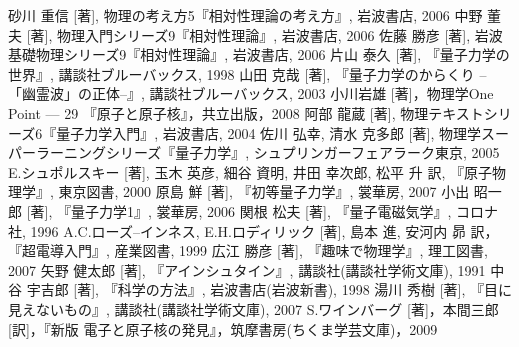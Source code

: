 \begin{thebibliography}{99}
     砂川 重信 [著], 物理の考え方5『相対性理論の考え方』, 岩波書店, 2006
     中野 董夫 [著], 物理入門シリーズ9『相対性理論』, 岩波書店, 2006
     佐藤 勝彦 [著], 岩波基礎物理シリーズ9『相対性理論』, 岩波書店, 2006
     片山 泰久 [著], 『量子力学の世界』, 講談社ブルーバックス, 1998
     山田 克哉 [著], 『量子力学のからくり --「幽霊波」の正体--』, 講談社ブルーバックス, 2003
     小川岩雄 [著]，物理学One Point --- 29 『原子と原子核』，共立出版，2008
      阿部 龍蔵 [著], 物理テキストシリーズ6『量子力学入門』, 岩波書店, 2004
      佐川 弘幸, 清水 克多郎 [著], 物理学スーパーラーニングシリーズ『量子力学』, シュプリンガーフェアラーク東京, 2005
      E.シュポルスキー [著], 玉木 英彦, 細谷 資明, 井田 幸次郎, 松平 升 訳, 『原子物理学\I』, 東京図書, 2000
      原島 鮮 [著], 『初等量子力学』, 裳華房, 2007
      小出 昭一郎 [著], 『量子力学1』, 裳華房, 2006
      関根 松夫 [著], 『量子電磁気学』, コロナ社, 1996
      A.C.ローズ--インネス, E.H.ロディリック [著], 島本 進, 安河内 昴 訳，『超電導入門』, 産業図書, 1999
    広江 勝彦 [著], 『趣味で物理学』, 理工図書, 2007
    矢野 健太郎 [著], 『アインシュタイン』, 講談社(講談社学術文庫), 1991
    中谷 宇吉郎 [著], 『科学の方法』, 岩波書店(岩波新書), 1998
    湯川 秀樹 [著], 『目に見えないもの』, 講談社(講談社学術文庫), 2007
    S.ワインバーグ [著]，本間三郎 [訳]，『新版 電子と原子核の発見』，筑摩書房(ちくま学芸文庫)，2009
\end{thebibliography}

